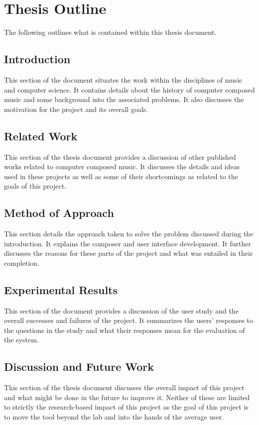 \section{Thesis Outline}
\label{sec:thesisoutline}

The following outlines what is contained within this thesis document.

\subsection{Introduction}
\label{subsec:thesisoutlineintroduction}

This section of the document situates the work within the disciplines of music and computer science.  It contains details about the history of computer composed music and some background into the associated problems.  It also discusses the motivation for the project and its overall goals.

\subsection{Related Work}
\label{subsec:thesisoutlinerelatedwork}

This section of the thesis document provides a discussion of other published works related to computer composed music.  It discusses the details and ideas used in these projects as well as some of their shortcomings as related to the goals of this project.

\subsection{Method of Approach}
\label{subsec:thesisoutlinemethodofapproach}

This section details the approach taken to solve the problem discussed during the introduction.  It explains the composer and user interface development.  It further discusses the reasons for these parts of the project and what was entailed in their completion.

\subsection{Experimental Results}
\label{subsec:thesisoutlineexperimentalresults}

This section of the document provides a discussion of the user study and the overall successes and failures of the project.  It summarizes the users' responses to the questions in the study and what their responses mean for the evaluation of the system.

\subsection{Discussion and Future Work}
\label{subsec:thesisoutlinediscusionandfuturework}

This section of the thesis document discusses the overall impact of this project and what might be done in the future to improve it.  Neither of these are limited to strictly the research-based impact of this project as the goal of this project is to move the tool beyond the lab and into the hands of the average user.